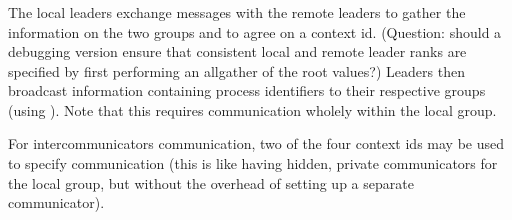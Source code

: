 \documentclass{article}
\begin{document}
\subsubsection{}
The local leaders exchange messages with the remote leaders to gather the
information on the two groups and to agree on a context id.  (Question: should
a debugging version ensure 
that consistent local and remote leader ranks are specified by first
performing an allgather of the root values?)  
Leaders then broadcast information containing process identifiers to
their respective groups (using 
). Note that this requires communication wholely
within the local group.  


For intercommunicators communication, two of the four context ids may
be used to specify communication (this is like having hidden, private
communicators for the local group, but without the overhead of setting
up a separate communicator). 
\end{document}
